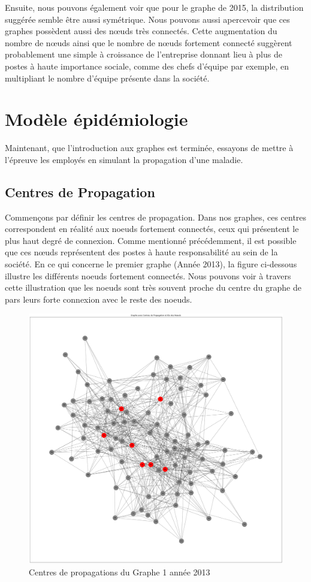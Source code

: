 \documentclass{article}
\begin{document}
Ensuite, nous pouvons également voir que pour le graphe de 2015, la distribution suggérée semble être aussi symétrique. Nous pouvons aussi apercevoir que ces graphes possèdent aussi des nœuds très connectés. Cette augmentation du nombre de nœuds ainsi que le nombre de nœuds fortement connecté suggèrent probablement une simple à croissance de l’entreprise donnant lieu à plus de postes à haute importance sociale, comme des chefs d’équipe par exemple, en multipliant le nombre d’équipe présente dans la société.

\section{Modèle épidémiologie}

Maintenant, que l'introduction aux graphes est terminée, essayons de mettre à l'épreuve les employés en simulant la propagation d'une maladie.

\subsection{Centres de Propagation}

Commençons par définir les centres de propagation. Dans nos graphes, ces centres correspondent en réalité aux noeuds fortement connectés, ceux qui présentent le plus haut degré de connexion. Comme mentionné précédemment, il est possible que ces nœuds représentent des postes à haute responsabilité au sein de la société. En ce qui concerne le premier graphe (Année 2013), la figure ci-dessous illustre les différents noeuds fortement connectés. Nous pouvons voir à travers cette illustration que les noeuds sont très souvent proche du centre du graphe de pars leurs forte connexion avec le reste des noeuds.

\begin{figure}[!h]
    \centering
    \includegraphics[width=15cm]{assets/epidemiologie/centre_propa_2013}
    \caption{Centres de propagations du Graphe 1 année 2013}
    \label{fig:centre_propa_2013}
\end{figure}
\end{document}
